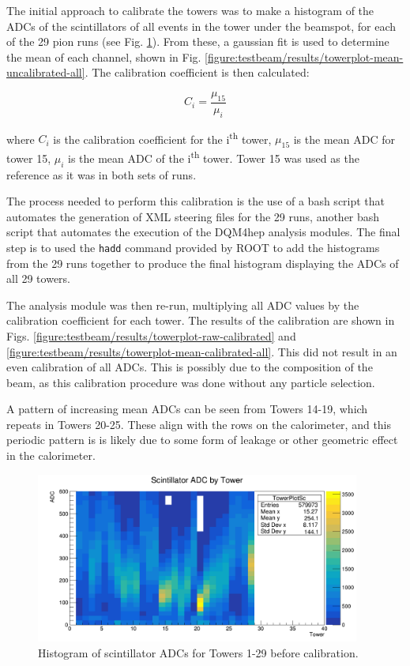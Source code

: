 The initial approach to calibrate the towers was to make a histogram of the \acrshort{ADC}s of the scintillators of all events in the tower under the beamspot, for each of the 29 pion runs (see Fig. \ref{figure:testbeam/results/towerplot-raw-uncalibrated}). From these, a gaussian fit is used to determine the mean of each channel, shown in Fig. \ref{figure:testbeam/results/towerplot-mean-uncalibrated-all}. The calibration coefficient is then calculated:

\begin{equation}
	C_i = \frac{\mu_{15}}{\mu_i}
\label{eq:calibration-coeff}
\end{equation}

where $C_i$ is the calibration coefficient for the i\textsuperscript{th} tower, $\mu_{15}$ is the mean \acrshort{ADC} for tower 15, $\mu_i$ is the mean \acrshort{ADC} of the i\textsuperscript{th} tower. Tower 15 was used as the reference as it was in both sets of runs.

The process needed to perform this calibration is the use of a bash script that automates the generation of XML steering files for the 29 runs, another bash script that automates the execution of the DQM4hep analysis modules. The final step is to used the \texttt{hadd} command provided by ROOT to add the histograms from the 29 runs together to produce the final histogram displaying the ADCs of all 29 towers.

The analysis module was then re-run, multiplying all ADC values by the calibration coefficient for each tower. The results of the calibration are shown in Figs. \ref{figure:testbeam/results/towerplot-raw-calibrated} and \ref{figure:testbeam/results/towerplot-mean-calibrated-all}. This did not result in an even calibration of all \acrshort{ADC}s. This is possibly due to the composition of the beam, as this calibration procedure was done without any particle selection.

A pattern of increasing mean ADCs can be seen from Towers 14-19, which repeats in Towers 20-25. These align with the rows on the calorimeter, and this periodic pattern is is likely due to some form of leakage or other geometric effect in the calorimeter. 

\begin{figure}[hp]
	\centering
	\includegraphics[width=0.95\textwidth]{../Pictures/IDEA/Calibration/towerplot-scintillator-uncalibrated.png}
	\caption{Histogram of scintillator \acrshort{ADC}s for Towers 1-29 before calibration.}
	\label{figure:testbeam/results/towerplot-raw-uncalibrated}
\end{figure}

